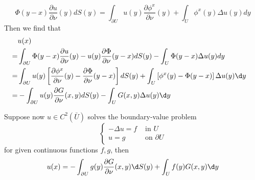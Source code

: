\begin{definition}
\begin{equation*}
        \Phi(y-x) \frac{\partial u}{\partial \nu}(y) d S(y)
        =
        \int_{\partial U} u(y) \frac{\partial \phi^x}{\partial \nu}(y)
        +
        \int_U \phi^x(y) \Delta u(y) dy
    \end{equation*}
    Then we find that
    \begin{equation*}
        \begin{aligned}
              & u(x)                                                                                                                                                & \\
            = & \int_{\partial U} \Phi(y-x) \frac{\partial u}{\partial \nu}(y)-u(y) \frac{\partial \Phi}{\partial \nu}(y-x) d S(y) -\int_U \Phi(y-x) \Delta u(y) dy   \\
            = & \int_{\partial U} u(y) \left[\frac{\partial \phi^x}{\partial \nu}(y)-\frac{\partial \Phi}{\partial \nu}(y-x)\right] dS(y)
            +
            \int_U \left[\phi^x(y)-\Phi(y-x)\right] \Delta u(y)\d y                                                                                                   \\
            = & -\int_{\partial U} u(y) \frac{\partial G}{\partial \nu}(x, y) d S(y)-\int_U G(x, y) \Delta u(y)\d y
        \end{aligned}
    \end{equation*}
\end{definition}

\begin{theorem}
    Suppose now $u \in C^2(\bar{U})$ solves the boundary-value problem
    \begin{equation*}
        \left\{\begin{aligned}
            -\Delta u=f & \text { in } U          \\
            u=g         & \text { on } \partial U
        \end{aligned}\right.
    \end{equation*}
    for given continuous functions $f, g$, then
    \begin{equation*}
        u(x)=-\int_{\partial U} g(y) \frac{\partial G}{\partial \nu}(x, y) \d S(y)+\int_U f(y) G(x, y) \d y
    \end{equation*}
\end{theorem}

